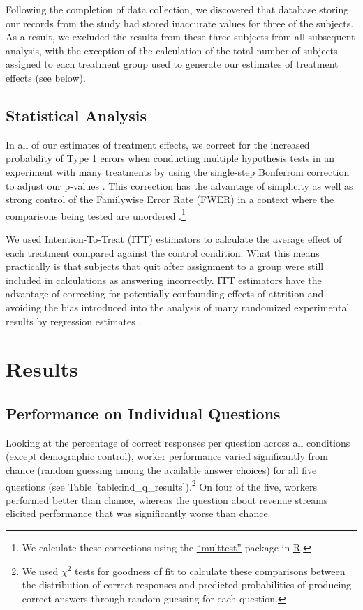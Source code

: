 \documentclass{chi2009}
\begin{document}
{Following the completion of data collection, we discovered that
database storing our records from the study had stored inaccurate
values for three of the subjects. As a result, we excluded the results
from these three subjects from all subsequent analysis, with the
exception of the calculation of the total number of subjects assigned
to each treatment group used to generate our estimates of treatment
effects (see below).

\subsection{Statistical Analysis} 

In all of our estimates of treatment effects, we correct for the
increased probability of Type 1 errors when conducting multiple
hypothesis tests in an experiment with many treatments by using the
single-step Bonferroni correction to adjust our p-values
\cite{shaffer1995, hsu1996}. This correction has the advantage of
simplicity as well as strong control of the Familywise Error Rate
(FWER) in a context where the comparisons being tested are unordered
\cite{rosenthalrubin1984}.\footnote{We calculate these corrections
  using the
  \href{http://cran.r-project.org/web/packages/multtest/index.html}{``multtest''}
  package in \href{http://www.r-project.org}{R}.}

We used Intention-To-Treat (ITT) estimators to calculate the average
effect of each treatment compared against the control condition. What
this means practically is that subjects that quit after assignment to
a group were still included in calculations as answering
incorrectly. ITT estimators have the advantage of correcting for
potentially confounding effects of attrition and avoiding the bias
introduced into the analysis of many randomized experimental results
by regression estimates \cite{freedman2008logistic,
  freedman2008multtreat}.

%

\section{Results}

\subsection{Performance on Individual Questions}
Looking at the percentage of correct responses per question across all
conditions (except demographic control), worker performance varied
significantly from chance (random guessing among the available answer
choices) for all five questions (see Table
\ref{table:ind_q_results}).\footnote{We used $\chi^{2}$ tests for
  goodness of fit to calculate these comparisons between the
  distribution of correct responses and predicted probabilities of
  producing correct answers through random guessing for each
  question.} On four of the five, workers performed better than
chance, whereas the question about revenue streams elicited
performance that was significantly worse than chance.

}
\end{document}
